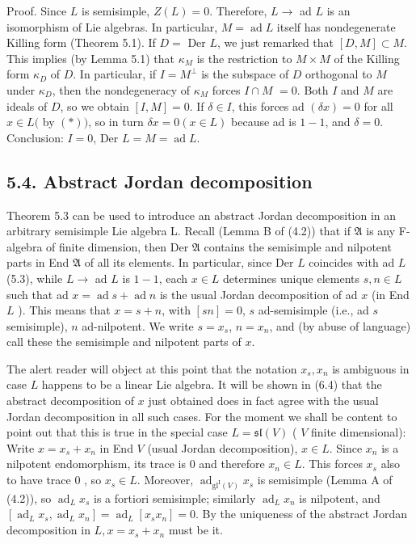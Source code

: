 \documentclass[10pt]{article}
\begin{document}
Proof. Since $L$ is semisimple, $Z(L)=0$. Therefore, $L \rightarrow$ ad $L$ is an isomorphism of Lie algebras. In particular, $M=\operatorname{ad} L$ itself has nondegenerate Killing form (Theorem 5.1). If $D=$ Der $L$, we just remarked that $[D, M] \subset M$. This implies (by Lemma 5.1) that $\kappa_{M}$ is the restriction to $M \times M$ of the Killing form $\kappa_{D}$ of $D$. In particular, if $I=M^{\perp}$ is the subspace of $D$ orthogonal to $M$ under $\kappa_{D}$, then the nondegeneracy of $\kappa_{M}$ forces $I \cap M$ $=0$. Both $I$ and $M$ are ideals of $D$, so we obtain $[I, M]=0$. If $\delta \in I$, this forces ad $(\delta x)=0$ for all $x \in L($ by $(*))$, so in turn $\delta x=0(x \in L)$ because ad is $1-1$, and $\delta=0$. Conclusion: $I=0$, Der $L=M=\operatorname{ad} L$.

\subsection*{5.4. Abstract Jordan decomposition}
Theorem 5.3 can be used to introduce an abstract Jordan decomposition in an arbitrary semisimple Lie algebra L. Recall (Lemma B of (4.2)) that if $\mathfrak{A}$ is any F-algebra of finite dimension, then Der $\mathfrak{A}$ contains the semisimple and nilpotent parts in End $\mathfrak{A}$ of all its elements. In particular, since Der $L$ coincides with ad $L$ (5.3), while $L \rightarrow$ ad $L$ is $1-1$, each $x \in L$ determines unique elements $s, n \in L$ such that ad $x=\operatorname{ad} s+\operatorname{ad} n$ is the usual Jordan decomposition of ad $x$ (in End $L$ ). This means that $x=s+n$, with $[s n]=0$, $s$ ad-semisimple (i.e., ad $s$ semisimple), $n$ ad-nilpotent. We write $s=x_{s}$, $n=x_{n}$, and (by abuse of language) call these the semisimple and nilpotent parts of $x$.

The alert reader will object at this point that the notation $x_{s}, x_{n}$ is ambiguous in case $L$ happens to be a linear Lie algebra. It will be shown in (6.4) that the abstract decomposition of $x$ just obtained does in fact agree with the usual Jordan decomposition in all such cases. For the moment we shall be content to point out that this is true in the special case $L=\mathfrak{s l}(V)$ ( $V$ finite dimensional): Write $x=x_{s}+x_{n}$ in End $V$ (usual Jordan decomposition), $x \in L$. Since $x_{n}$ is a nilpotent endomorphism, its trace is 0 and therefore $x_{n} \in L$. This forces $x_{s}$ also to have trace 0 , so $x_{s} \in L$. Moreover, $\operatorname{ad}_{\mathrm{gl}^{\mathrm{I}}(V)} x_{s}$ is semisimple (Lemma A of (4.2)), so $\operatorname{ad}_{L} x_{s}$ is a fortiori semisimple; similarly $\operatorname{ad}_{L} x_{n}$ is nilpotent, and $\left[\operatorname{ad}_{L} x_{s}, \operatorname{ad}_{L} x_{n}\right]=\operatorname{ad}_{L}\left[x_{s} x_{n}\right]=0$. By the uniqueness of the abstract Jordan decomposition in $L, x=x_{s}+x_{n}$ must be it.
\end{document}
